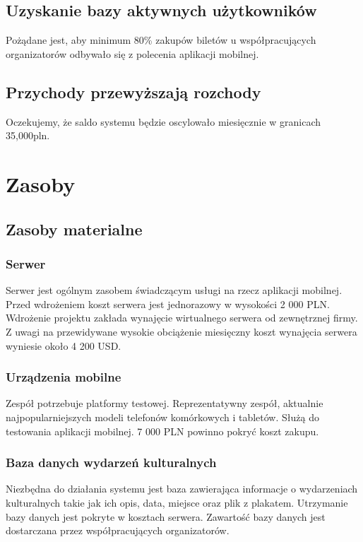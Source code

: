 \documentclass[10pt]{dokument-ppi}
\begin{document}
\subsection{Uzyskanie bazy aktywnych użytkowników}
Pożądane jest, aby minimum 80\% zakupów biletów u współpracujących organizatorów
odbywało się z polecenia aplikacji mobilnej.

\subsection{Przychody przewyższają rozchody}
Oczekujemy, że saldo systemu będzie oscylowało miesięcznie w granicach
35,000pln.


\section{Zasoby}

\subsection{Zasoby materialne}

\subsubsection{Serwer}
Serwer jest ogólnym zasobem świadczącym usługi na rzecz aplikacji mobilnej.
Przed wdrożeniem koszt serwera jest jednorazowy w wysokości 2 000 PLN. Wdrożenie
projektu zakłada wynajęcie wirtualnego serwera od zewnętrznej firmy. Z uwagi na
przewidywane wysokie obciążenie miesięczny koszt wynajęcia serwera wyniesie
około 4 200 USD.

\subsubsection{Urządzenia mobilne}
Zespół potrzebuje platformy testowej. Reprezentatywny zespół, aktualnie
najpopularniejszych modeli telefonów komórkowych i tabletów. Służą do testowania
aplikacji mobilnej. 7 000 PLN powinno pokryć koszt zakupu.

\subsubsection{Baza danych wydarzeń kulturalnych}
Niezbędna do działania systemu jest baza zawierająca informacje o wydarzeniach
kulturalnych takie jak ich opis, data, miejsce oraz plik z plakatem. Utrzymanie
bazy danych jest pokryte w kosztach serwera. Zawartość bazy danych jest
dostarczana przez współpracujących organizatorów.
\end{document}
